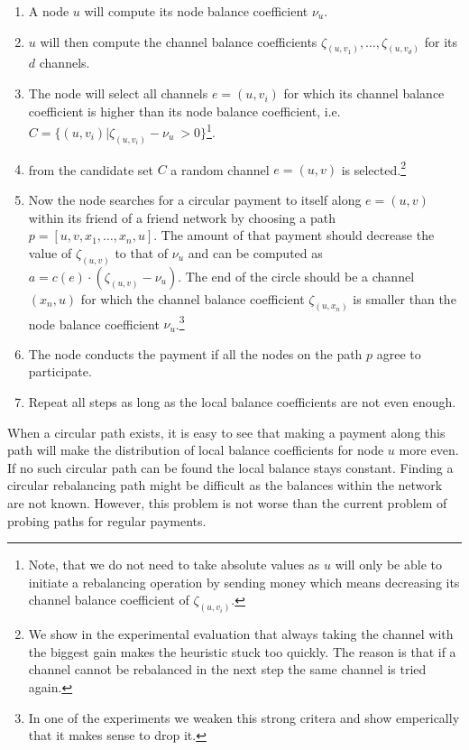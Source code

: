 \documentclass[a4paper]{paper}
\begin{document}
\begin{enumerate}
\item A node $u$ will compute its node balance coefficient $\nu_u$.
\item $u$ will then compute the channel balance coefficients $\zeta_{(u,v_1)},\dots,\zeta_{(u,v_d)}$ for its $d$ channels.
\item The node will select all channels $e=(u,v_i)$ for which its channel balance coefficient is higher 
than its node balance coefficient, i.e.~$C = \{(u,v_i) | \zeta_{(u,v_i)} - \nu_u\ > 0\}$\footnote{
  Note, that we do not need to take absolute values as $u$ will only be able to initiate a rebalancing operation by sending money which means decreasing its channel balance coefficient of $\zeta_{(u,v_i)}$.}.
\item from the candidate set $C$ a random channel $e=(u,v)$ is selected.\footnote{
  We show in the experimental evaluation that always taking the channel with the biggest gain makes the heuristic stuck too quickly. 
  The reason is that if a channel cannot be rebalanced in the next step the same channel is tried again.} 
\item Now the node searches for a circular payment to itself along $e=(u,v)$ within its friend of a friend network by choosing a path $p = [u,v,x_1,\dots,x_n,u]$. The amount of that payment should decrease the value of $\zeta_{(u,v)}$ to that of $\nu_u$ and can be computed as $a = c(e)\cdot (\zeta_{(u,v)}-\nu_u)$. The end of the circle should be a channel $(x_n,u)$ for which the channel balance coefficient $\zeta_{(u,x_n)}$ is smaller than the node balance coefficient $\nu_u$.\footnote{In one of the experiments we weaken this strong critera and show emperically that it makes sense to drop it.}
\item The node conducts the payment if all the nodes on the path $p$ agree to participate. 
\item Repeat all steps as long as the local balance coefficients are not even enough.
\end{enumerate}

When a circular path exists, it is easy to see that making a payment along this path will make the distribution of local balance coefficients for node $u$ more even.
If no such circular path can be found the local balance stays constant.
Finding a circular rebalancing path might be difficult as the balances within the network are not known. 
However, this problem is not worse than the current problem of probing paths for regular payments.
\end{document}
